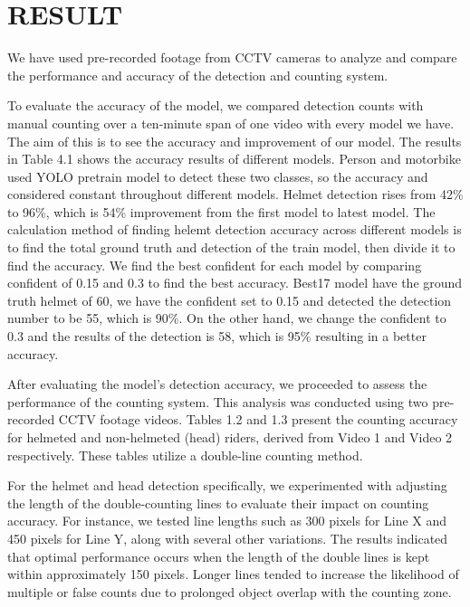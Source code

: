\chapter{RESULT}

\noindent\hspace{2.5em}We have used pre-recorded footage from CCTV cameras to analyze and compare the performance and accuracy of the detection and counting system. 

\vspace{1em}

\noindent\hspace{2.5em}To evaluate the accuracy of the model, we compared detection counts with manual counting over a ten-minute span of one video with every model we have. The aim of this is to see the accuracy and improvement of our model. The results in Table 4.1 shows the accuracy results of different models. Person and motorbike used YOLO pretrain model to detect these two classes, so the accuracy and considered constant throughout different models. Helmet detection rises from 42\% to 96\%, which is 54\% improvement from the first model to latest model. The calculation method of finding helemt detection accuracy across different models is to find the total ground truth and detection of the train model, then divide it to find the accuracy. We find the best confident for each model by comparing confident of 0.15 and 0.3 to find the best accuracy. Best17 model have the ground truth helmet of 60, we have the confident set to 0.15 and detected the detection number to be 55, which is 90\%. On the other hand, we change the confident to 0.3 and the results of the detection is 58, which is 95\% resulting in a better accuracy.

\vspace{1em}

\noindent\hspace{2.5em}After evaluating the model's detection accuracy, we proceeded to assess the performance of the counting system. This analysis was conducted using two pre-recorded CCTV footage videos. Tables 1.2 and 1.3 present the counting accuracy for helmeted and non-helmeted (head) riders, derived from Video 1 and Video 2 respectively. These tables utilize a double-line counting method.

\vspace{1em}
For the helmet and head detection specifically, we experimented with adjusting the length of the double-counting lines to evaluate their impact on counting accuracy. For instance, we tested line lengths such as 300 pixels for Line X and 450 pixels for Line Y, along with several other variations. The results indicated that optimal performance occurs when the length of the double lines is kept within approximately 150 pixels. Longer lines tended to increase the likelihood of multiple or false counts due to prolonged object overlap with the counting zone.

